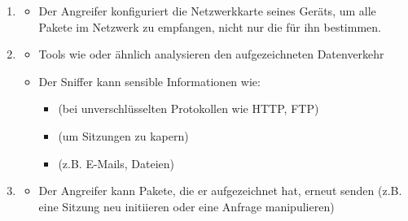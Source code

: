\begin{infoBox}[title=Funktionsweise von Paket-Sniffing]
    \begin{enumerate}
        \item {}
        \begin{itemize}
            \item Der Angreifer konfiguriert die Netzwerkkarte seines Geräts, um alle Pakete im Netzwerk zu empfangen, nicht nur die für ihn bestimmen.
        \end{itemize}
        \item {}
        \begin{itemize}
            \item Tools wie  oder ähnlich analysieren den aufgezeichneten Datenverkehr
            \item Der Sniffer kann sensible Informationen wie:
            \begin{itemize}
                \item {} (bei unverschlüsselten Protokollen wie HTTP, FTP)
                \item {} (um Sitzungen zu kapern)
                \item {} (z.B. E-Mails, Dateien)
            \end{itemize}
        \end{itemize}
        \item {}
        \begin{itemize}
            \item Der Angreifer kann Pakete, die er aufgezeichnet hat, erneut senden (z.B. eine Sitzung neu initiieren oder eine Anfrage manipulieren)
        \end{itemize}
    \end{enumerate}
\end{infoBox}
